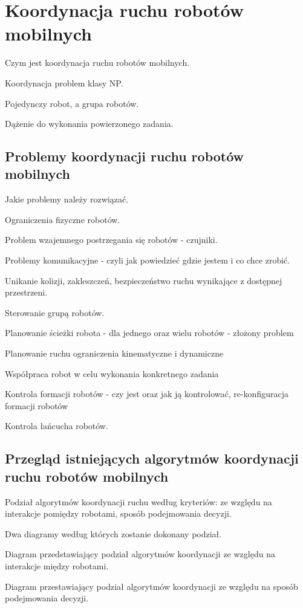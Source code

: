 \chapter{Koordynacja ruchu robotów mobilnych}

Czym jest koordynacja ruchu robotów mobilnych.

Koordynacja problem klasy NP.

Pojedynczy robot, a grupa robotów.

Dążenie do wykonania powierzonego zadania.


\section{Problemy koordynacji ruchu robotów mobilnych}

Jakie problemy należy rozwiązać.

Ograniczenia fizyczne robotów.

Problem wzajemnego postrzegania się robotów - czujniki. 

Problemy komunikacyjne - czyli jak powiedzieć gdzie jestem i co chce zrobić.

Unikanie kolizji, zakleszczeń, bezpieczeństwo ruchu wynikające z dostępnej przestrzeni. 

Sterowanie grupą robotów.

Planowanie ścieżki robota - dla jednego oraz wielu robotów - złożony problem 

Planowanie ruchu ograniczenia kinematyczne i dynamiczne

Współpraca robot w celu wykonania konkretnego zadania 

Kontrola formacji robotów - czy jest oraz jak ją kontrolować, re-konfiguracja formacji robotów

Kontrola łańcucha robotów.


\section{Przegląd istniejących algorytmów koordynacji ruchu robotów mobilnych}

Podział algorytmów koordynacji ruchu według kryteriów: ze względu na interakcje pomiędzy robotami, sposób podejmowania decyzji.

Dwa diagramy według których zostanie dokonany podział.

Diagram przedstawiający podział algorytmów koordynacji ze względu na interakcje między robotami.

Diagram przestawiający podział algorytmów koordynacji ze względu na sposób podejmowania decyzji.

